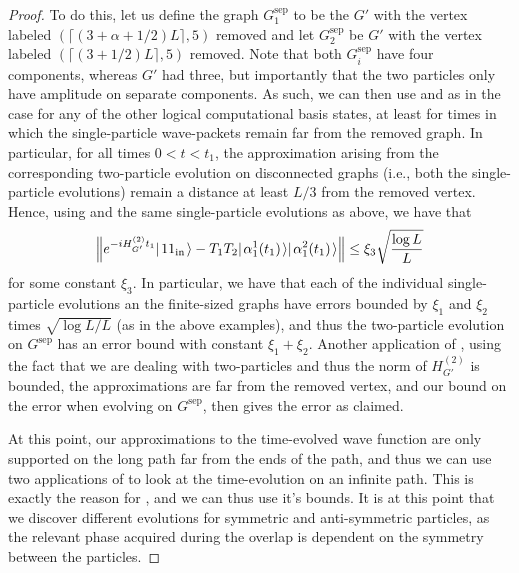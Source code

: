 \documentclass[../thesis-main/thesis-main]{subfiles}
\begin{document}
\begin{proof}
To do this, let us define the graph $G^{\text{sep}}_1$ to be the $G'$ with the vertex labeled $(\lceil (3 + \alpha + 1/2)L\rceil, 5)$ removed and let $G^{\text{sep}}_2$ be $G'$ with the vertex labeled $(\lceil (3+1/2)L\rceil,5)$ removed.  Note that both $G^\text{sep}_i$ have four components, whereas $G'$ had three, but importantly that the two particles only have amplitude on separate components.  As such, we can then use  and  as in the case for any of the other logical computational basis states, at least for times in which the single-particle wave-packets remain far from the removed graph.  In particular, for all times $ 0 < t < t_1$, the approximation arising from the corresponding two-particle evolution on disconnected graphs (i.e., both the single-particle evolutions) remain a distance at least $L/3$ from the removed vertex.  Hence, using  and the same single-particle evolutions as above, we have that
\begin{align}
  \Big\Vert e^{- i H_{G'}^{(2)} t_1} |\mspace{2mu} 11_\text{in} \mspace{2mu} \rangle - T_1 T_2 |\mspace{2mu} \alpha_1^{1}(t_1) \mspace{2mu} \rangle|\mspace{2mu} \alpha_{1}^2 (t_1) \mspace{2mu} \rangle \Big\Vert \leq \xi_3 \sqrt{\frac{\log L}{L}}
\end{align}
for some constant $\xi_3$.  In particular, we have that each of the individual single-particle evolutions an the finite-sized graphs have errors bounded by $\xi_1$ and $\xi_2$ times $\sqrt{\log L/L}$ (as in the above examples), and thus the two-particle evolution on $G^{\text{sep}}$ has an error bound with constant $\xi_1 + \xi_2$.  Another application of , using the fact that we are dealing with two-particles and thus the norm of $H_{G'}^{(2)}$ is bounded, the approximations are far from the removed vertex, and our bound on the error when evolving on  $G^{\text{sep}}$, then gives the error as claimed.

At this point, our approximations to the time-evolved wave function are only supported on the long path far from the ends of the path, and thus we can use two applications of  to look at the time-evolution on an infinite path.  This is exactly the reason for , and we can thus use it's bounds.  It is at this point that we discover different evolutions for symmetric and anti-symmetric particles, as the relevant phase acquired during the overlap is dependent on the symmetry between the particles.


\end{proof}
\end{document}
